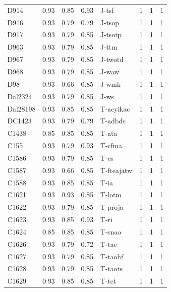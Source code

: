 \documentclass[a4paper,10pt,twoside,fleqn]{article}
\begin{document}
\begin{table}[h!]
\begin{tabular}{lrrrlrrr}
D914     & 0.93 & 0.85 & 0.93 &      J-tsf    &    1    &    1    &    1   \\
D916     & 0.93 & 0.79 & 0.79 &     J-tsop    &    1    &    1    &    1   \\
D917     & 0.93 & 0.79 & 0.85 &    J-tsotp    &    1    &    1    &    1   \\
D963     & 0.93 & 0.79 & 0.85 &      J-ttm    &    1    &    1    &    1   \\
D967     & 0.93 & 0.79 & 0.85 &    J-twotd    &    1    &    1    &    1   \\
D968     & 0.93 & 0.79 & 0.85 &      J-waw    &    1    &    1    &    1   \\
D98      & 0.93 & 0.66 & 0.85 &      J-wmk    &    1    &    1    &    1   \\
Dal2324  & 0.93 & 0.79 & 0.85 &       J-ws    &    1    &    1    &    1   \\
Dal28198 & 0.93 & 0.85 & 0.85 &  T-acyikac    &    1    &    1    &    1   \\
DC1423   & 0.93 & 0.79 & 0.79 &    T-adbds    &    1    &    1    &    1   \\
C1438    & 0.85 & 0.85 & 0.85 &      T-ata    &    1    &    1    &    1   \\
C155     & 0.93 & 0.79 & 0.93 &     T-cfma    &    1    &    1    &    1   \\
C1586    & 0.93 & 0.79 & 0.85 &       T-cs    &    1    &    1    &    1   \\
C1587    & 0.93 & 0.66 & 0.85 & T-fteajatw    &    1    &    1    &    1   \\
C1588    & 0.93 & 0.85 & 0.85 &       T-ia    &    1    &    1    &    1   \\
C1621    & 0.93 & 0.93 & 0.85 &     T-lotm    &    1    &    1    &    1   \\
C1622    & 0.93 & 0.79 & 0.85 &    T-proja    &    1    &    1    &    1   \\
C1623    & 0.93 & 0.85 & 0.93 &       T-ri    &    1    &    1    &    1   \\
C1624    & 0.85 & 0.85 & 0.85 &     T-snao    &    1    &    1    &    1   \\
C1626    & 0.93 & 0.79 & 0.72 &      T-tac    &    1    &    1    &    1   \\
C1627    & 0.93 & 0.79 & 0.85 &    T-taohf    &    1    &    1    &    1   \\
C1628    & 0.93 & 0.79 & 0.85 &    T-taots    &    1    &    1    &    1   \\
C1629    & 0.93 & 0.85 & 0.85 &      T-tet    &    1    &    1    &    1   \\

\end{tabular}
\end{table}
\end{document}
